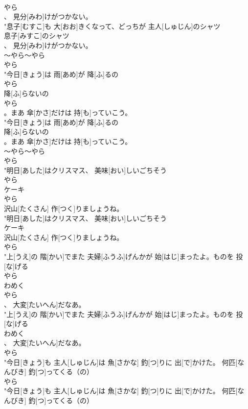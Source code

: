 \documentclass[8pt]{extreport}
\begin{document}
\begin{CJK}{UTF8}{min}
\\	やら
\\	、 見分[みわ]けがつかない。
\\	"息子[むすこ]も 大[おお]きくなって、どっちが 主人[しゅじん]のシャツ
\\	息子[みすこ]のシャツ
\\	、 見分[みわ]けがつかない。
\\	～やら～やら 
\\	やら
\\	"今日[きょう]は 雨[あめ]が 降[ふ]るの
\\	やら
\\	降[ふ]らないの
\\	やら
\\	。まあ 傘[かさ]だけは 持[も]っていこう。
\\	"今日[きょう]は 雨[あめ]が 降[ふ]るの
\\	降[ふ]らないの
\\	。まあ 傘[かさ]だけは 持[も]っていこう。
\\	～やら～やら 
\\	やら
\\	"明日[あした]はクリスマス、 美味[おい]しいごちそう
\\	やら
\\	ケーキ
\\	やら
\\	沢山[たくさん] 作[つく]りましょうね。
\\	"明日[あした]はクリスマス、 美味[おい]しいごちそう
\\	ケーキ
\\	沢山[たくさん] 作[つく]りましょうね。
\\	やら
\\	"上[うえ]の 階[かい]でまた 夫婦[ふうふ]げんかが 始[はじ]まったよ。ものを 投[な]げる
\\	やら
\\	わめく
\\	やら
\\	、 大変[たいへん]だなあ。
\\	"上[うえ]の 階[かい]でまた 夫婦[ふうふ]げんかが 始[はじ]まったよ。ものを 投[な]げる
\\	わめく
\\	、 大変[たいへん]だなあ。
\\	やら
\\	"今日[きょう]も 主人[しゅじん]は 魚[さかな] 釣[つ]りに 出[で]かけた。 何匹[なんびき] 釣[つ]ってくる（の）
\\	やら
\\	"今日[きょう]も 主人[しゅじん]は 魚[さかな] 釣[つ]りに 出[で]かけた。 何匹[なんびき] 釣[つ]ってくる（の）

\end{CJK}
\end{document}
